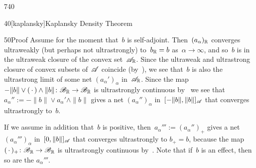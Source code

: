 \begin{parsec}{740}
\begin{point}{40}[kaplansky]{Kaplansky Density Theorem}
\begin{point}{50}{Proof}
Assume for the moment that~$b$ is self-adjoint.
Then~$(a_\alpha)_{\mathbb{R}}$
converges ultraweakly (but perhaps not ultrastrongly)
to~$b_{\mathbb{R}}=b$
as~$\alpha\to\infty$,
and so~$b$ is in the ultraweak
closure of the convex set~$\mathscr{A}_{\mathbb{R}}$.
Since the ultraweak and ultrastrong closure
of convex subsets of~$\mathscr{A}$
coincide (by~),
we see that~$b$ is also the ultrastrong limit
of some net $(a_\alpha')_\alpha$ in~$\mathscr{A}_{\mathbb{R}}$.
Since the map~$-\|b\|\vee(\,\cdot\,)\wedge \|b\|\colon
\mathscr{B}_{\mathbb{R}}\to\mathscr{B}_{\mathbb{R}}$
is ultrastrongly continuous by~
we see that 
$a_\alpha'' := -\|b\|\vee a_\alpha'\wedge \|b\|$
gives a net $(a_\alpha'')_\alpha$
in~$[-\|b\|,\|b\|]_{\mathscr{A}}$
that
converges ultrastrongly
to~$b$.

If we assume in addition
that~$b$ is positive,
then~$a_\alpha''' := (a_\alpha'')_+$
gives a net~$(a_\alpha''')_\alpha$
in~$[0,\|b\|]_{\mathscr{A}}$
that converges ultrastrongly to $b_+=b$,
because the map $(\,\cdot\,)_+\colon \mathscr{B}_{\mathbb{R}}\to\mathscr{B}_{\mathbb{R}}$
is ultrastrongly continuous by~.
Note that if~$b$ is an effect,
then so are the $a_\alpha'''$.


\end{point}
\end{point}
\end{parsec}
